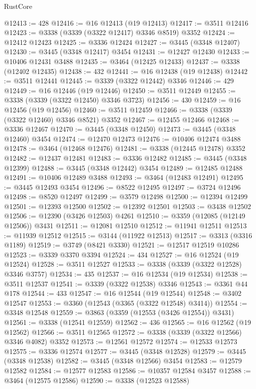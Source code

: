 \begin{lexlean}{RustCore}
\begin{coremodule}
@12413 := 428
@12416 := @16 @12413 (@19 @12413)
@12417 := @3511 @12416
@12423 := @3338 (@3339 (@3322 @12417) @3346 @8519) @3352
@12424 := @12412 @12423
@12425 := @3336 @12424
@12427 := @3445 (@3348 @12407)
@12430 := @3445 (@3348 @12417) @3454
@12431 := @12427 @12430
@12433 := @10406 @12431 @3488
@12435 := @3464 (@12425 @12433)
@12437 := @3338 (@12402 @12435)
@12438 := 432
@12441 := @16 @12438 (@19 @12438)
@12442 := @3511 @12441
@12445 := @3339 (@3322 @12442) @3346
@12446 := 429
@12449 := @16 @12446 (@19 @12446)
@12450 := @3511 @12449
@12455 := @3338 (@3339 (@3322 @12450) @3346 @3723)
@12456 := 430
@12459 := @16 @12456 (@19 @12456)
@12460 := @3511 @12459
@12466 := @3338 (@3339 (@3322 @12460) @3346 @8521) @3352
@12467 := @12455 @12466
@12468 := @3336 @12467
@12470 := @3445 (@3348 @12450)
@12473 := @3445 (@3348 @12460) @3454
@12474 := @12470 @12473
@12476 := @10406 @12474 @3488
@12478 := @3464 (@12468 @12476)
@12481 := @3338 (@12445 @12478) @3352
@12482 := @12437 @12481
@12483 := @3336 @12482
@12485 := @3445 (@3348 @12399)
@12488 := @3445 (@3348 @12442) @3454
@12489 := @12485 @12488
@12491 := @10406 @12489 @3488
@12493 := @3464 (@12483 @12491)
@12495 := @3445 @12493 @3454
@12496 := @8522 @12495
@12497 := @3724 @12496
@12498 := @8520 @12497
@12499 := @3579 @12498
@12500 := @12394 @12499
@12501 := @12393 @12500
@12502 := @12392 @12501
@12503 := @3438 @12502
@12506 := @12390 (@3426 @12503) @4261
@12510 := @3359 (@12085 (@12149 @12506)) @3431
@12511 := @12081 @12510
@12512 := @11941 @12511
@12513 := @11939 @12512
@12515 := @3144 (@11922 @12513)
@12517 := @3313 (@3316 @1189)
@12519 := @3749 (@8421 @3330)
@12521 := @12517 @12519 @10286
@12523 := @3339 @3370 @3394
@12524 := 434
@12527 := @16 @12524 (@19 @12524)
@12528 := @3511 @12527
@12533 := @3338 (@3339 (@3322 @12528) @3346 @3757)
@12534 := 435
@12537 := @16 @12534 (@19 @12534)
@12538 := @3511 @12537
@12541 := @3339 (@3322 @12538) @3346
@12543 := @3361 @44 @178
@12544 := 433
@12547 := @16 @12544 (@19 @12544)
@12548 := @3402 @12547
@12553 := @3360 (@12543 (@3365 (@3322 @12548) @3414))
@12554 := @3348 @12548
@12559 := @3863 (@3359 (@12553 (@3426 @12554)) @3431)
@12561 := @3338 (@12541 @12559)
@12562 := 436
@12565 := @16 @12562 (@19 @12562)
@12566 := @3511 @12565
@12572 := @3338 (@3339 (@3322 @12566) @3346 @4082) @3352
@12573 := @12561 @12572
@12574 := @12533 @12573
@12575 := @3336 @12574
@12577 := @3445 (@3348 @12528)
@12579 := @3445 (@3348 @12538)
@12582 := @3445 (@3348 @12566) @3454
@12583 := @12579 @12582
@12584 := @12577 @12583
@12586 := @10357 @12584 @3457
@12588 := @3464 (@12575 @12586)
@12590 := @3338 (@12523 @12588)

\end{coremodule}
\end{lexlean}
